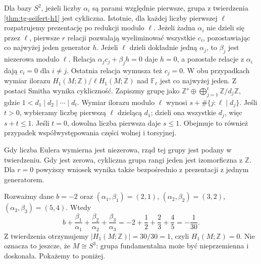 \begin{uwaga}
Dla bazy $S^2$, jeżeli liczby $\alpha_i$ są parami
względnie pierwsze, grupa z twierdzenia
\ref{thm:tg-seifert-h1} jest cykliczna.
Istotnie, dla każdej liczby pierwszej $\ell$
rozpatrujemy prezentację po redukcji modulo $\ell$.
Jeżeli żadna $\alpha_i$ nie dzieli się przez $\ell$,
pierwsze $r$ relacji pozwalają wyeliminować wszystkie
$c_i$, pozostawiając co najwyżej jeden generator $h$.
Jeżeli $\ell$ dzieli dokładnie jedną $\alpha_j$,
to $\beta_j$ jest niezerowa modulo $\ell$.
Relacja $\alpha_jc_j+\beta_jh=0$ daje $h=0$,
a pozostałe relacje z $\alpha_i$ dają $c_i=0$
dla $i\ne j$. Ostatnia relacja wymusza też $c_j=0$.
W obu przypadkach wymiar ilorazu
$H_1(M;\mathbb Z)/\ell H_1(M;\mathbb Z)$
nad $\mathbb F_\ell$ jest co najwyżej jeden.
Z postaci Smitha wynika cykliczność. Zapiszmy
grupę jako $\mathbb Z^s\oplus
\bigoplus_{j=1}^t\mathbb Z/d_j\mathbb Z$,
gdzie $1<d_1\mid d_2\mid\cdots\mid d_t$.
Wymiar ilorazu modulo $\ell$ wynosi
$s+\#\{j:\ell\mid d_j\}$.
Jeśli $t>0$, wybieramy liczbę pierwszą $\ell$
dzielącą $d_1$; dzieli ona wszystkie $d_j$,
więc $s+t\le1$. Jeśli $t=0$, dowolna liczba
pierwsza daje $s\le1$. Obejmuje to również
przypadek współwystępowania części wolnej i torsyjnej.

Gdy liczba Eulera wymierna jest niezerowa,
rząd tej grupy jest podany w twierdzeniu.
Gdy jest zerowa, cykliczna grupa rangi jeden
jest izomorficzna z $\mathbb Z$.
Dla $r=0$ powyższy wniosek wynika także
bezpośrednio z prezentacji z jednym generatorem.
\end{uwaga}

\begin{przyklad}
Rozważmy dane $b=-2$ oraz
$(\alpha_1,\beta_1)=(2,1)$,
$(\alpha_2,\beta_2)=(3,2)$,
$(\alpha_3,\beta_3)=(5,4)$.
Wtedy
\[
b+\frac{\beta_1}{\alpha_1}
+\frac{\beta_2}{\alpha_2}
+\frac{\beta_3}{\alpha_3}
=-2+\frac12+\frac23+\frac45=-\frac1{30}.
\]
Z twierdzenia otrzymujemy $|H_1(M;\mathbb Z)|=30/30=1$,
czyli $H_1(M;\mathbb Z)=0$. Nie oznacza to
jeszcze, że $M\cong S^3$: grupa fundamentalna może
być nieprzemienna i doskonała. Pokażemy to poniżej.
\end{przyklad}

